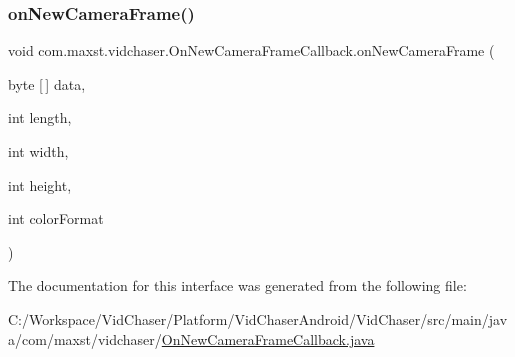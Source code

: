 \subsubsection{\texorpdfstring{on\+New\+Camera\+Frame()}{onNewCameraFrame()}}
{\footnotesize\ttfamily void com.\+maxst.\+vidchaser.\+On\+New\+Camera\+Frame\+Callback.\+on\+New\+Camera\+Frame (\begin{DoxyParamCaption}\item[{byte \mbox{[}$\,$\mbox{]}}]{data,  }\item[{int}]{length,  }\item[{int}]{width,  }\item[{int}]{height,  }\item[{int}]{color\+Format }\end{DoxyParamCaption})}



The documentation for this interface was generated from the following file\+:\begin{DoxyCompactItemize}
\item 
C\+:/\+Workspace/\+Vid\+Chaser/\+Platform/\+Vid\+Chaser\+Android/\+Vid\+Chaser/src/main/java/com/maxst/vidchaser/\hyperlink{_on_new_camera_frame_callback_8java}{On\+New\+Camera\+Frame\+Callback.\+java}\end{DoxyCompactItemize}
